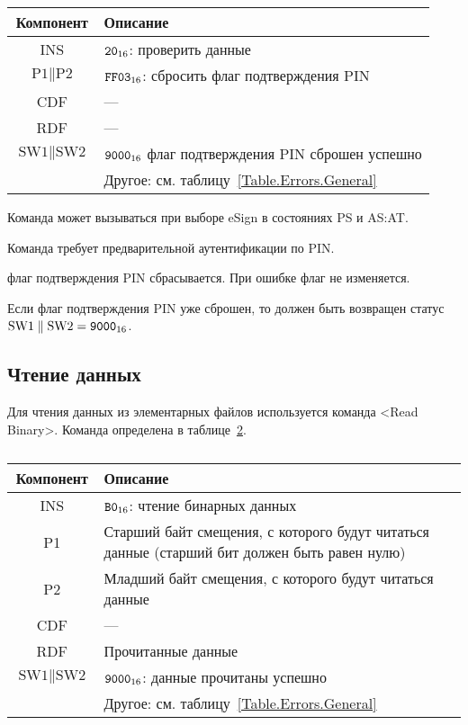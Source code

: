 \begin{table}[hbt]
\caption{}\label{Table.Oper.VerifyDeauthCmd}
\begin{tabular}{|c|p{14cm}|}
\hline
Компонент & Описание \\
\hline
\hline
INS & $\texttt{20}_{16}$: проверить данные\\
\hline
$\text{P1} \parallel \text{P2}$ & $\texttt{FF03}_{16}$: сбросить 
флаг подтверждения PIN\\
\hline
CDF & ---  \\
\hline 
RDF &  --- \\
\hline
$\text{SW1} \parallel \text{SW2}$ & $\texttt{9000}_{16}$ 
флаг подтверждения PIN сброшен успешно\\
\cline{2-2}
& Другое: см. таблицу~\ref{Table.Errors.General} \\
\hline
\end{tabular}
\end{table}

Команда может вызываться при выборе eSign в состояниях PS и AS:AT.

Команда требует предварительной аутентификации по PIN.

 флаг подтверждения PIN
сбрасывается. При ошибке флаг не изменяется.

Если флаг подтверждения PIN уже сброшен, то должен быть возвращен статус
$\text{SW1} \parallel \text{SW2} = \texttt{9000}_{16}$.

\subsection{Чтение данных}
\label{Oper.Descr.Read}

Для чтения данных из элементарных файлов используется команда <Read Binary>.
Команда определена в таблице~\ref{Table.Oper.ReadCmd}.

\begin{table}[hbt]
\caption{}\label{Table.Oper.ReadCmd}
\begin{tabular}{|c|p{14cm}|}
\hline
Компонент & Описание \\
\hline
\hline
INS & $\texttt{B0}_{16}$: чтение бинарных данных \\
\hline
P1 & Старший байт смещения, с которого будут читаться данные (старший бит 
должен быть равен нулю) \\
\hline
P2 & Младший байт смещения, с которого будут читаться данные\\
\hline
CDF &  --- \\
\hline 
RDF & 	Прочитанные данные \\
\hline
$\text{SW1} \parallel\text{SW2}$ & 
$\texttt{9000}_{16}$: данные прочитаны успешно \\
\cline{2-2}
& Другое: см. таблицу~\ref{Table.Errors.General} \\
\hline
\end{tabular}
\end{table}


